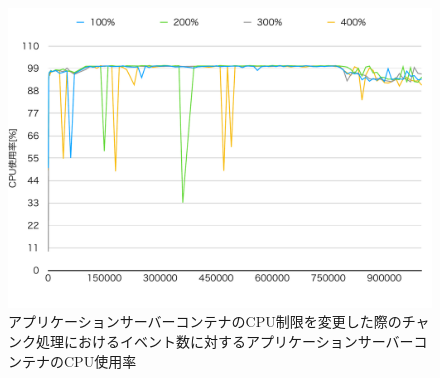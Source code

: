 \documentclass[../../../../../main]{subfiles}
\begin{document}
    \begin{figure}[H]
        \centering
        \includegraphics[width=12cm]{graph}
        \caption{アプリケーションサーバーコンテナのCPU制限を変更した際のチャンク処理におけるイベント数に対するアプリケーションサーバーコンテナのCPU使用率}
        \label{fig:stream-change-app-cpu-limit-app-cpu-app_1024-db_1_1024}
    \end{figure}
\end{document}
